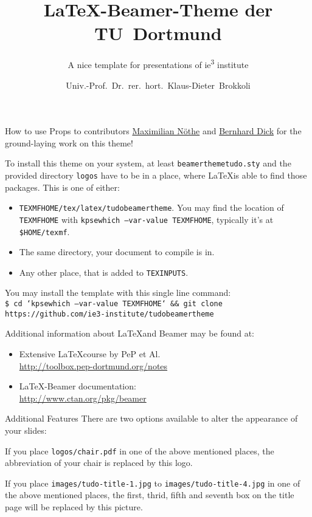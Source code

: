 \documentclass[aspectratio=1610, 9pt]{beamer}
\title{\LaTeX-Beamer-Theme der TU~Dortmund}
\subtitle{A nice template for presentations of ie\textsuperscript{3} institute}
\author[Prof.~K.-D.~Brokkoli]{Univ.-Prof.~Dr.~{}rer.~hort.~Klaus-Dieter~Brokkoli}
\institute[ie\textsuperscript{3}]{Institute of Energy Systems, Energy Efficiency and Energy Economics}
\begin{document}
\maketitle

\begin{frame}{How to use}
  Props to contributors \href{https://github.com/maxnoe}{Maximilian N\"othe} and \href{https://github.com/bernharddick}{Bernhard Dick} for the ground-laying work on this theme!
  
  \medskip
  To install this theme on your system, at least \texttt{beamerthemetudo.sty} and the provided directory \texttt{logos} have to be in a place, where \LaTeX is able to find those packages.
  This is one of either:
  \begin{itemize}
    \item \texttt{TEXMFHOME/tex/latex/tudobeamertheme}. You may find the location of \texttt{TEXMFHOME} with \texttt{kpsewhich --var-value TEXMFHOME}, typically it's at \texttt{\$HOME/texmf}.
    \item The same directory, your document to compile is in.
    \item Any other place, that is added to \texttt{TEXINPUTS}.
  \end{itemize}
  
  \medskip
  You may install the template with this single line command:\\
  \texttt{\footnotesize\$ cd `kpsewhich --var-value TEXMFHOME` \&\& git clone https://github.com/ie3-institute/tudobeamertheme}

  \medskip
  Additional information about \LaTeX and Beamer may be found at:
  \begin{itemize}
    \item Extensive \LaTeX course by PeP et Al. \\
      \url{http://toolbox.pep-dortmund.org/notes}
    \item \LaTeX-Beamer documentation:\\
    \url{http://www.ctan.org/pkg/beamer}
  \end{itemize}
\end{frame}

\begin{frame}{Additional Features}
  There are two options available to alter the appearance of your slides:

  \medskip
  If you place \texttt{logos/chair.pdf} in one of the above mentioned places, the abbreviation of your chair is replaced by this logo.

  \medskip
  If you place \texttt{images/tudo-title-1.jpg} to \texttt{images/tudo-title-4.jpg} in one of the above mentioned places, the first, thrid, fifth and seventh box on the title page will be replaced by this picture.
\end{frame}
\end{document}
